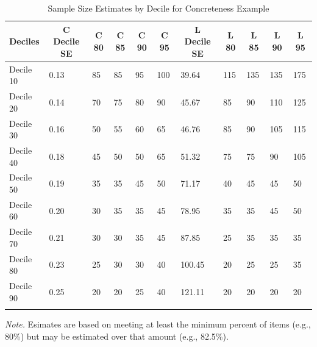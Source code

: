 \documentclass[
  man]{apa7}
\begin{document}
\begin{table}[tbp]

\begin{center}
\begin{threeparttable}

\caption{\label{tab:table-example}Sample Size Estimates by Decile for Concreteness Example}

\begin{tabular}{lllllllllll}
\toprule
Deciles & \multicolumn{1}{c}{C Decile SE} & \multicolumn{1}{c}{C 80} & \multicolumn{1}{c}{C 85} & \multicolumn{1}{c}{C 90} & \multicolumn{1}{c}{C 95} & \multicolumn{1}{c}{L Decile SE} & \multicolumn{1}{c}{L 80} & \multicolumn{1}{c}{L 85} & \multicolumn{1}{c}{L 90} & \multicolumn{1}{c}{L 95}\\
\midrule
Decile 10 & 0.13 & 85 & 85 & 95 & 100 & 39.64 & 115 & 135 & 135 & 175\\
Decile 20 & 0.14 & 70 & 75 & 80 & 90 & 45.67 & 85 & 90 & 110 & 125\\
Decile 30 & 0.16 & 50 & 55 & 60 & 65 & 46.76 & 85 & 90 & 105 & 115\\
Decile 40 & 0.18 & 45 & 50 & 50 & 65 & 51.32 & 75 & 75 & 90 & 105\\
Decile 50 & 0.19 & 35 & 35 & 45 & 50 & 71.17 & 40 & 45 & 45 & 50\\
Decile 60 & 0.20 & 30 & 35 & 35 & 45 & 78.95 & 35 & 35 & 45 & 50\\
Decile 70 & 0.21 & 30 & 30 & 35 & 45 & 87.85 & 25 & 35 & 35 & 35\\
Decile 80 & 0.23 & 25 & 30 & 30 & 40 & 100.45 & 20 & 25 & 25 & 35\\
Decile 90 & 0.25 & 20 & 20 & 25 & 40 & 121.11 & 20 & 20 & 20 & 20\\
\bottomrule
\addlinespace
\end{tabular}

\begin{tablenotes}[para]
\normalsize{\textit{Note.} Esimates are based on meeting at least the minimum percent of items (e.g., 80\%) but may be estimated over that amount (e.g., 82.5\%).}
\end{tablenotes}

\end{threeparttable}
\end{center}

\end{table}
\end{document}
